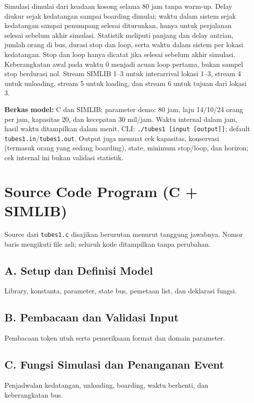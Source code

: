 \documentclass[a4paper,10pt]{article}
\begin{document}
Simulasi dimulai dari keadaan kosong selama 80 jam tanpa warm-up. Delay diukur sejak kedatangan sampai boarding dimulai; waktu dalam sistem sejak kedatangan sampai penumpang selesai diturunkan, hanya untuk perjalanan selesai sebelum akhir simulasi. Statistik meliputi panjang dan delay antrian, jumlah orang di bus, durasi stop dan loop, serta waktu dalam sistem per lokasi kedatangan. Stop dan loop hanya dicatat jika selesai sebelum akhir simulasi. Keberangkatan awal pada waktu 0 menjadi acuan loop pertama, bukan sampel stop berdurasi nol. Stream SIMLIB 1--3 untuk interarrival lokasi 1--3, stream 4 untuk unloading, stream 5 untuk loading, dan stream 6 untuk tujuan dari lokasi 3.

\noindent\textbf{Berkas model:} C dan SIMLIB; parameter demo: 80 jam, laju 14/10/24 orang per jam, kapasitas 20, dan kecepatan 30 mil/jam. Waktu internal dalam jam, hasil waktu ditampilkan dalam menit. CLI: \texttt{./tubes1 [input [output]]}; default \texttt{tubes1.in}/\texttt{tubes1.out}. Output juga memuat cek kapasitas, konservasi (termasuk orang yang sedang boarding), state, minimum stop/loop, dan horizon; cek internal ini bukan validasi statistik.

\newpage
\section*{Source Code Program (C + SIMLIB)}
\noindent Source dari \texttt{tubes1.c} disajikan berurutan menurut tanggung jawabnya.
Nomor baris mengikuti file asli; seluruh kode ditampilkan tanpa perubahan.

\subsection*{A. Setup dan Definisi Model}
\noindent Library, konstanta, parameter, state bus, pemetaan list, dan deklarasi fungsi.


\subsection*{B. Pembacaan dan Validasi Input}
\noindent Pembacaan token utuh serta pemeriksaan format dan domain parameter.


\subsection*{C. Fungsi Simulasi dan Penanganan Event}
\noindent Penjadwalan kedatangan, unloading, boarding, waktu berhenti, dan keberangkatan bus.

\end{document}
